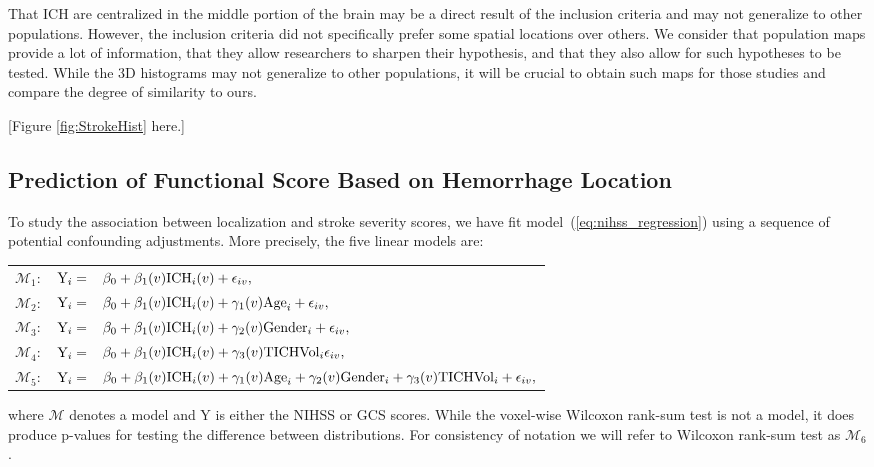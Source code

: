 \documentclass[10pt]{article}\usepackage[]{graphicx}\usepackage[]{color}
\begin{document}
That ICH are centralized in the middle portion of the brain may be a direct result of the inclusion criteria and may not generalize to other populations. However, the inclusion criteria \citep{mould_minimally_2013} did not specifically prefer some spatial locations over others. We consider that population maps provide a lot of information, that they allow researchers to sharpen their hypothesis, and that they also allow for such hypotheses to be tested. While the 3D histograms may not generalize to other populations, it will be crucial to obtain such maps for those studies and compare the degree of similarity to ours.


[Figure \ref{fig:StrokeHist} here.]


\subsection{Prediction of Functional Score Based on Hemorrhage Location}

To study the association between localization and stroke severity scores, we have fit model~(\ref{eq:nihss_regression}) using a sequence of  potential confounding adjustments. More precisely, the five linear models are:

\vspace{0.1in}
\begin{tabular}{rll}
\noindent $\mathcal{M}_1:$ & $ {\rm Y}_i =$ & \hspace{-0.18in} $\beta_0+\beta_1(v) {\rm ICH}_i(v) + \epsilon_{iv}, $\\
$\mathcal{M}_2:$ & $ {\rm Y}_i = $ & \hspace{-0.18in} $ \beta_0+\beta_1(v) {\rm ICH}_i(v) + \gamma_1(v){\rm Age}_i + \epsilon_{iv}, $\\
$\mathcal{M}_3:$ & $ {\rm Y}_i = $ & \hspace{-0.18in} $ \beta_0+\beta_1(v) {\rm ICH}_i(v) + \gamma_2(v){\rm Gender}_i + \epsilon_{iv}, $\\
$\mathcal{M}_4:$ &$  {\rm Y}_i = $ & \hspace{-0.18in} $ \beta_0+\beta_1(v) {\rm ICH}_i(v) + \gamma_3(v){\rm TICHVol}_i \epsilon_{iv},$ \\
$\mathcal{M}_5:$ &$  {\rm Y}_i = $ & \hspace{-0.18in} $ \beta_0+\beta_1(v) {\rm ICH}_i(v) + \gamma_1(v){\rm Age}_i  +\gamma_2(v){\rm Gender}_i +\gamma_3(v){\rm TICHVol}_i + \epsilon_{iv},$ \\
\end{tabular}
\vspace{0.1in}
\newline
where $\mathcal{M}$ denotes a model and Y is either the NIHSS or GCS scores.  While the voxel-wise Wilcoxon rank-sum test is not a model, it does produce p-values for testing the difference between distributions. For consistency of notation we will refer to Wilcoxon rank-sum test as $\mathcal{M}_6$. 
\end{document}
